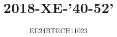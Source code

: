 \documentclass[journal,12pt,onecolumn]{IEEEtran}
\theoremstyle{remark}
\begin{document}

\vspace{3cm}

\title{2018-XE-'40-52'}
\author{EE24BTECH11023}
\maketitle

{\let\newpage\relax\maketitle}

\renewcommand{\thefigure}{\theenumi}
\renewcommand{\thetable}{\theenumi}
\setlength{\intextsep}{10pt} %


\renewcommand{\thetable}{\theenumi}
\end{document}
